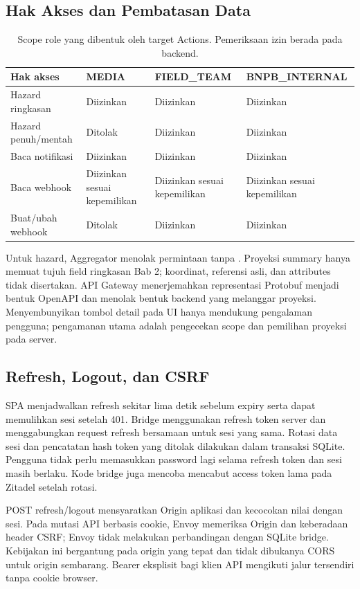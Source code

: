 \subsection{Hak Akses dan Pembatasan Data}
\begin{table}[H]\small
\begin{tabularx}{\textwidth}{@{}P{3cm}YYY@{}}
\toprule \textbf{Hak akses} & \textbf{MEDIA} & \textbf{FIELD\_TEAM} & \textbf{BNPB\_INTERNAL}\\\midrule
Hazard ringkasan & Diizinkan & Diizinkan & Diizinkan\\
Hazard penuh/mentah & Ditolak & Diizinkan & Diizinkan\\
Baca notifikasi & Diizinkan & Diizinkan & Diizinkan\\
Baca webhook & Diizinkan sesuai kepemilikan & Diizinkan sesuai kepemilikan & Diizinkan sesuai kepemilikan\\
Buat/ubah webhook & Ditolak & Diizinkan & Diizinkan\\\bottomrule
\end{tabularx}
\caption{Scope role yang dibentuk oleh target Actions. Pemeriksaan izin berada pada backend.}
\end{table}

Untuk hazard, Aggregator menolak permintaan  tanpa . Proyeksi summary hanya memuat tujuh field ringkasan Bab 2; koordinat, referensi asli, dan attributes tidak disertakan. API Gateway menerjemahkan representasi Protobuf menjadi bentuk OpenAPI dan menolak bentuk backend yang melanggar proyeksi. Menyembunyikan tombol detail pada UI hanya mendukung pengalaman pengguna; pengamanan utama adalah pengecekan scope dan pemilihan proyeksi pada server.

\subsection{Refresh, Logout, dan CSRF}
SPA menjadwalkan refresh sekitar lima detik sebelum expiry serta dapat memulihkan sesi setelah 401. Bridge menggunakan refresh token server dan menggabungkan request refresh bersamaan untuk sesi yang sama. Rotasi data sesi dan pencatatan hash token yang ditolak dilakukan dalam transaksi SQLite. Pengguna tidak perlu memasukkan password lagi selama refresh token dan sesi masih berlaku. Kode bridge juga mencoba mencabut access token lama pada Zitadel setelah rotasi.

POST refresh/logout mensyaratkan Origin aplikasi dan kecocokan nilai  dengan sesi. Pada mutasi API berbasis cookie, Envoy memeriksa Origin dan keberadaan header CSRF; Envoy tidak melakukan perbandingan dengan SQLite bridge. Kebijakan ini bergantung pada origin yang tepat dan tidak dibukanya CORS untuk origin sembarang. Bearer eksplisit bagi klien API mengikuti jalur tersendiri tanpa cookie browser.


